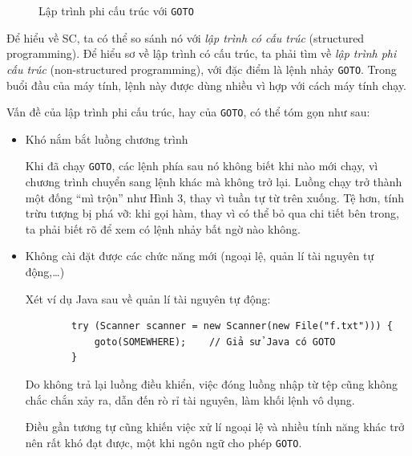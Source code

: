 \documentclass[../../thesis]{subfiles}
\begin{document}
\begin{figure}
    \centering
    \vspace*{-6mm}
    
    \vspace*{-10mm}    %
    \caption{Lập trình phi cấu trúc với \texttt{GOTO}}
    \label{fig:non-structured-programming}
\end{figure}

Để hiểu về SC, ta có thể so sánh nó với \emph{lập trình có cấu trúc} (structured
programming). Để hiểu sơ về lập trình có cấu trúc, ta phải tìm về \emph{lập
trình phi cấu trúc} (non-structured programming), với đặc điểm là lệnh nhảy
\texttt{GOTO}. Trong buổi đầu của máy tính, lệnh này được dùng nhiều vì hợp với
cách máy tính chạy.

Vấn đề của lập trình phi cấu trúc, hay của \texttt{GOTO}, có thể tóm gọn như
sau:

\begin{itemize}
    \item
        Khó nắm bắt luồng chương trình

        Khi đã chạy \texttt{GOTO}, các lệnh phía sau nó không biết khi nào mới
        chạy, vì chương trình chuyển sang lệnh khác mà không trở lại. Luồng chạy
        trở thành một đống ``mì trộn'' như Hình 3, thay vì tuần tự từ trên
        xuống. Tệ hơn, tính trừu tượng bị phá vỡ: khi gọi hàm, thay vì có thể bỏ
        qua chi tiết bên trong, ta phải biết rõ để xem có lệnh nhảy bất ngờ nào
        không.
\end{itemize}

%     

\begin{itemize}[resume, before = \vspace*{-\dimexpr\topsep+\partopsep\relax}]
    \item
        Không cài đặt được các chức năng mới (ngoại lệ, quản lí tài nguyên tự
        động,\ldots)

        Xét ví dụ Java sau về quản lí tài nguyên tự động:

        \begin{verbatim}
        try (Scanner scanner = new Scanner(new File("f.txt"))) {
            goto(SOMEWHERE);    // Giả sử Java có GOTO
        }
        \end{verbatim}

        Do không trả lại luồng điều khiển, việc đóng luồng nhập từ tệp cũng
        không chắc chắn xảy ra, dẫn đến rò rỉ tài nguyên, làm khối lệnh vô dụng.

        Điều gần tương tự cũng khiến việc xử lí ngoại lệ và nhiều tính năng khác
        trở nên rất khó đạt được, một khi ngôn ngữ cho phép \texttt{GOTO}.
\end{itemize}
\end{document}
